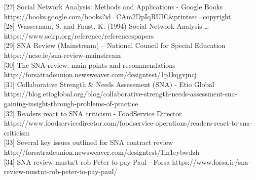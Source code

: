 \documentclass[
  letterpaper,
  DIV=11,
  numbers=noendperiod]{scrartcl}
\begin{document}
{[}27{]} Social Network Analysis: Methods and Applications - Google
Books
https://books.google.com/books?id=CAm2DpIqRUIC\&printsec=copyright\\
{[}28{]} Wasserman, S. and Faust, K. (1994) Social Network Analysis
\ldots{} https://www.scirp.org/reference/referencespapers\\
{[}29{]} SNA Review (Mainstream) -- National Council for Special
Education https://ncse.ie/sna-review-mainstream\\
{[}30{]} The SNA review: main points and recommendations
http://forsatradeunion.newsweaver.com/designtest/1p1kqgvjncj\\
{[}31{]} Collaborative Strength \& Needs Assessment (SNA) - Etio Global
https://blog.etioglobal.org/blog/collaborative-strength-needs-assessment-sna-gaining-insight-through-problems-of-practice\\
{[}32{]} Readers react to SNA criticism - FoodService Director
https://www.foodservicedirector.com/foodservice-operations/readers-react-to-sna-criticism\\
{[}33{]} Several key issues outlined for SNA contract review
http://forsatradeunion.newsweaver.com/designtest/1in1eybwdzh\\
{[}34{]} SNA review mustn't rob Peter to pay Paul - Forsa
https://www.forsa.ie/sna-review-mustnt-rob-peter-to-pay-paul/\\
\end{document}
